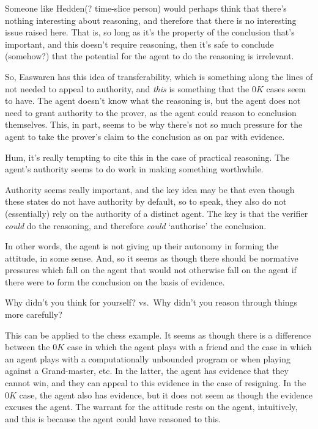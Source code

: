 \documentclass[10pt]{article}
\begin{document}
Someone like Hedden(? time-slice person) would perhaps think that there's nothing interesting about reasoning, and therefore that there is no interesting issue raised here.
That is, so long as it's the property of the conclusion that's important, and this doesn't require reasoning, then it's safe to conclude (somehow?) that the potential for the agent to do the reasoning is irrelevant.

So, Easwaren has this idea of transferability, which is something along the lines of not needed to appeal to authority, and \emph{this} is something that the \(0K\) cases seem to have.
The agent doesn't know what the reasoning is, but the agent does not need to grant authority to the prover, as the agent could reason to conclusion themselves.
This, in part, seems to be why there's not so much pressure for the agent to take the prover's claim to the conclusion as on par with evidence.

Hum, it's really tempting to cite this in the case of practical reasoning.
The agent's authority seems to do work in making something worthwhile.

Authority seems really important, and the key idea may be that even though these states do not have authority by default, so to speak, they also do not (essentially) rely on the authority of a distinct agent.
The key is that the verifier \emph{could} do the reasoning, and therefore \emph{could} `authorise' the conclusion.

In other words, the agent is not giving up their autonomy in forming the attitude, in some sense.
And, so it seems as though there should be normative pressures which fall on the agent that would not otherwise fall on the agent if there were to form the conclusion on the basis of evidence.

Why didn't you think for yourself?
vs.\
Why didn't you reason through things more carefully?

This can be applied to the chess example.
It seems as though there is a difference between the \(0K\) case in which the agent plays with a friend and the case in which an agent plays with a computationally unbounded program or when playing against a Grand-master, etc.
In the latter, the agent has evidence that they cannot win, and they can appeal to this evidence in the case of resigning.
In the \(0K\) case, the agent also has evidence, but it does not seem as though the evidence excuses the agent.
The warrant for the attitude rests on the agent, intuitively, and this is because the agent could have reasoned to this.
\end{document}
